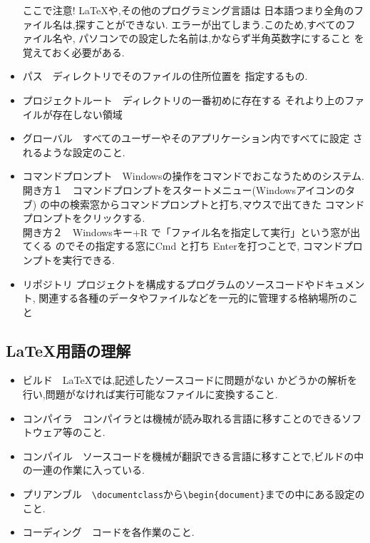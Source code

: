 \documentclass{ltjsarticle}
\begin{document}
\begin{itemize}
        ここで注意! LaTeXや,その他のプログラミング言語は
        日本語つまり全角のファイル名は,探すことができない.
        エラーが出てしまう.このため,すべてのファイル名や,
        パソコンでの設定した名前は,かならず半角英数字にすること
        を覚えておく必要がある.
  \item パス　ディレクトリでそのファイルの住所位置を
        指定するもの.
  \item プロジェクトルート　ディレクトリの一番初めに存在する
        それより上のファイルが存在しない領域
  \item グローバル　すべてのユーザーやそのアプリケーション内ですべてに設定
        されるような設定のこと.
  \item コマンドプロンプト　Windowsの操作をコマンドでおこなうためのシステム.\\
        開き方１　コマンドプロンプトをスタートメニュー(Windowsアイコンのタブ)
        の中の検索窓からコマンドプロンプトと打ち,マウスで出てきた
        コマンドプロンプトをクリックする.\\
        開き方２　Windowsキー+R で「ファイル名を指定して実行」という窓が出てくる
        のでその指定する窓にCmd と打ち Enterを打つことで,
        コマンドプロンプトを実行できる.
  \item リポジトリ
        プロジェクトを構成するプログラムのソースコードやドキュメント,
         関連する各種のデータやファイルなどを一元的に管理する格納場所のこと

\end{itemize}

\subsection{\LaTeX 用語の理解}
\begin{itemize}
  \item ビルド　\LaTeX では,記述したソースコードに問題がない
        かどうかの解析を行い,問題がなければ実行可能なファイルに変換すること.
  \item コンパイラ　コンパイラとは機械が読み取れる言語に移すことのできるソフトウェア等のこと.
  \item コンパイル　ソースコードを機械が翻訳できる言語に移すことで,ビルドの中の一連の作業に入っている.
  \item プリアンブル　\verb|\documentclass|から\verb|\begin{document}|までの中にある設定のこと.
  \item コーディング　コードを各作業のこと.
\end{itemize}
\end{document}
